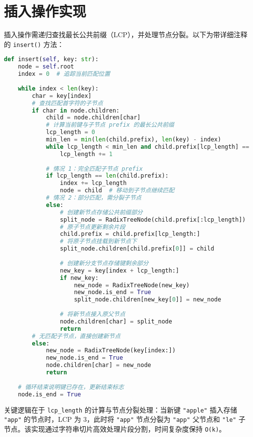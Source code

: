 \section{插入操作实现}
插入操作需递归查找最长公共前缀（LCP），并处理节点分裂。以下为带详细注释的 \texttt{insert()} 方法：\par
\begin{lstlisting}[language=python]
def insert(self, key: str):
    node = self.root
    index = 0  # 追踪当前匹配位置
    
    while index < len(key):
        char = key[index]
        # 查找匹配首字符的子节点
        if char in node.children:
            child = node.children[char]
            # 计算当前键与子节点 prefix 的最长公共前缀
            lcp_length = 0
            min_len = min(len(child.prefix), len(key) - index)
            while lcp_length < min_len and child.prefix[lcp_length] == key[index + lcp_length]:
                lcp_length += 1
            
            # 情况 1：完全匹配子节点 prefix
            if lcp_length == len(child.prefix):
                index += lcp_length
                node = child  # 移动到子节点继续匹配
            # 情况 2：部分匹配，需分裂子节点
            else:
                # 创建新节点存储公共前缀部分
                split_node = RadixTreeNode(child.prefix[:lcp_length])
                # 原子节点更新剩余片段
                child.prefix = child.prefix[lcp_length:]
                # 将原子节点挂载到新节点下
                split_node.children[child.prefix[0]] = child
                
                # 创建新分支节点存储键剩余部分
                new_key = key[index + lcp_length:]
                if new_key:
                    new_node = RadixTreeNode(new_key)
                    new_node.is_end = True
                    split_node.children[new_key[0]] = new_node
                
                # 将新节点接入原父节点
                node.children[char] = split_node
                return
        # 无匹配子节点，直接创建新节点
        else:
            new_node = RadixTreeNode(key[index:])
            new_node.is_end = True
            node.children[char] = new_node
            return
    
    # 循环结束说明键已存在，更新结束标志
    node.is_end = True
\end{lstlisting}
关键逻辑在于 \texttt{lcp\_{}length} 的计算与节点分裂处理：当新键 \texttt{"apple"} 插入存储 \texttt{"app"} 的节点时，LCP 为 3，此时将 \texttt{"app"} 节点分裂为 \texttt{"app"} 父节点和 \texttt{"le"} 子节点。该实现通过字符串切片高效处理片段分割，时间复杂度保持 \texttt{O(k)}。\par

